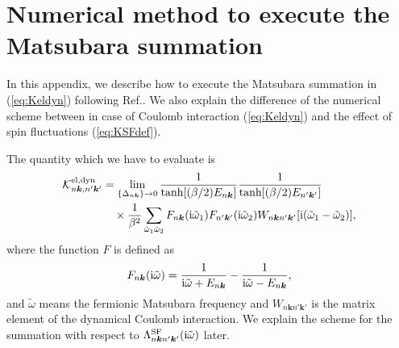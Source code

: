 

%
%
\appendix
\chapter{Numerical method to execute the Matsubara summation}
\label{appdx:Msum}

In this appendix, we describe how to execute the Matsubara summation in (\ref{eq:Keldyn}) 
following Ref.\cite{RAphD}. We also explain the difference of the numerical scheme between in case of
Coulomb interaction (\ref{eq:Keldyn}) and the effect of spin fluctuations (\ref{eq:KSFdef}).

The quantity which we have to evaluate is 
%
\begin{equation}
	\begin{split}
        {\mathcal K}^{\rm el, dyn}_{n\bm k,n'\bm k'} & =
	\lim_{\{\Delta_{n\bm k}\} \to 0}
	\frac{1}{\tanh[(\beta/2)E_{n\bm k}]}\frac{1}{\tanh[(\beta/2)E_{n'\bm k'}]} \\
	&\quad \times
	\frac{1}{\beta^2}
	\sum_{\tilde{\omega}_1\tilde{\omega}_2}
	F_{n\bm k}({\rm i}\tilde\omega_1)F_{n'\bm k'}({\rm i}\tilde\omega_2)
	W_{n\bm kn'\bm k'}[{\rm i}(\tilde\omega_1 - \tilde\omega_2)],
	\label{eq:Keldyn}
\end{split}
\end{equation}
%
where the function $F$ is defined as
%
\begin{equation}
F_{n\bm k}({\rm i}\tilde\omega) = 
\frac{1}{ {\rm i} \tilde\omega + E_{n\bm k}}-\frac{1}{ {\rm i} \tilde\omega - E_{n\bm k}},
	\label{eq:Ffunc}
\end{equation}
%
and $\tilde\omega$ means the fermionic Matsubara frequency and
$W_{n\bm kn'\bm k'}$ is the matrix element of the dynamical Coulomb interaction.
We explain the scheme for the summation with respect to 
$\Lambda^{\rm SF}_{n\bm k n'\bm k'}({\rm i}\tilde{\omega})$ later.

